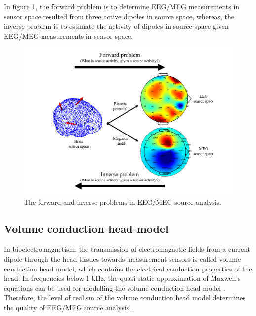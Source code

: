 In figure \ref{fig:ForwardInverse}, the forward problem is to determine EEG/MEG measurements in sensor space resulted from three active dipoles in source space, whereas, the inverse problem is to estimate the activity of dipoles in source space given EEG/MEG measurements in sensor space.
\begin{figure}[!b]
\centering
\includegraphics[width=1\textwidth]{images/ForwardInverse.png} %
\caption{The forward and inverse problems in EEG/MEG source analysis.}
\label{fig:ForwardInverse}
\end{figure}
\FloatBarrier
\subsection{Volume conduction head model}
In 
bioelectromagnetism, the transmission of electromagnetic fields from a current dipole through the head tissues towards measurement sensors is called volume conduction head model, which contains the electrical conduction properties of the head.
In frequencies below 1 kHz, the quasi-static approximation of Maxwell's equations can be used for modelling the volume conduction head model \cite{Plonsey1967}.
Therefore, the level of realism of the volume conduction head model determines the quality of EEG/MEG source analysis \cite{Haueisen2014}.

